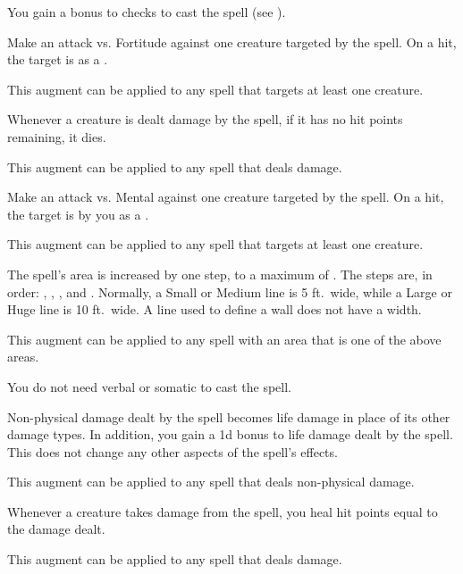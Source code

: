         {
             You gain a  bonus to  checks to cast the spell (see ).

             Make an attack vs. Fortitude against one creature targeted by the spell.
            On a hit, the target is  as a .
            \par This augment can be applied to any spell that targets at least one creature.

             Whenever a creature is dealt damage by the spell, if it has no hit points remaining, it dies.
            \par This augment can be applied to any spell that deals damage.

             Make an attack vs. Mental against one creature targeted by the spell.
            On a hit, the target is  by you as a .
            \par This augment can be applied to any spell that targets at least one creature.

             The spell's area is increased by one step, to a maximum of \areahuge.
            The steps are, in order: \areasmall, \areamed, \arealarge, and \areahuge.
            Normally, a Small or Medium line is 5 ft.\ wide, while a Large or Huge line is 10 ft.\ wide.
            A line used to define a wall does not have a width.
            \par This augment can be applied to any spell with an area that is one of the above areas.

             You do not need verbal or somatic  to cast the spell.

             Non-physical damage dealt by the spell becomes life damage in place of its other damage types.
            In addition, you gain a \plus1d bonus to life damage dealt by the spell.
            This does not change any other aspects of the spell's effects.
            \par This augment can be applied to any spell that deals non-physical damage.

             Whenever a creature takes damage from the spell, you heal hit points equal to the damage dealt.
            \par This augment can be applied to any spell that deals damage.

}

